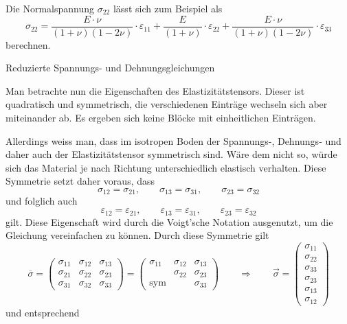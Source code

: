 Die Normalspannung $\sigma_{22}$ lässt sich zum Beispiel als
\[
\sigma_{22}
=
\frac{E\cdot\nu}{(1+\nu)(1-2\nu)}\cdot\varepsilon_{11}+\frac{E}{(1+\nu)}\cdot\varepsilon_{22}+\frac{E\cdot\nu}{(1+\nu)(1-2\nu)}\cdot\varepsilon_{33}
\]
berechnen.

Reduzierte Spannungs- und Dehnungsgleichungen

Man betrachte nun die Eigenschaften des Elastizitätstensors.
Dieser ist quadratisch und symmetrisch, die verschiedenen Einträge wechseln sich aber miteinander ab.
Es ergeben sich keine Blöcke mit einheitlichen Einträgen.

Allerdings weiss man, dass im isotropen Boden der Spannungs-, Dehnungs- und daher auch der Elastizitätstensor symmetrisch sind.
Wäre dem nicht so, würde sich das Material je nach Richtung unterschiedlich elastisch verhalten.
Diese Symmetrie setzt daher voraus, dass
\[
\sigma_{12}
=
\sigma_{21}
,
\qquad
\sigma_{13}
=
\sigma_{31}
,
\qquad
\sigma_{23}
=
\sigma_{32}
\]
und folglich auch
\[
\varepsilon_{12}
=
\varepsilon_{21}
,
\qquad
\varepsilon_{13}
=
\varepsilon_{31}
,
\qquad
\varepsilon_{23}
=
\varepsilon_{32}
\]
gilt.
Diese Eigenschaft wird durch die Voigt'sche Notation \cite{spannung:Voigtsche-Notation} ausgenutzt, um die Gleichung vereinfachen zu können.
Durch diese Symmetrie gilt
\[
\overline{\sigma}
=
\begin{pmatrix}
	\sigma_{11} & \sigma_{12} & \sigma_{13} \\ 
	\sigma_{21} & \sigma_{22} & \sigma_{23} \\
	\sigma_{31} & \sigma_{32} & \sigma_{33}
\end{pmatrix}
=
\begin{pmatrix}
	\sigma_{11} & \sigma_{12} & \sigma_{13} \\ 
  	            & \sigma_{22} & \sigma_{23} \\
	 \text{sym} &             & \sigma_{33} 
\end{pmatrix}
\qquad
\Rightarrow
\qquad
\vec{\sigma}
=
\begin{pmatrix}
    \sigma_{11}\\
	\sigma_{22}\\
	\sigma_{33}\\
	\sigma_{23}\\
	\sigma_{13}\\
	\sigma_{12}
\end{pmatrix}
\]
und entsprechend
